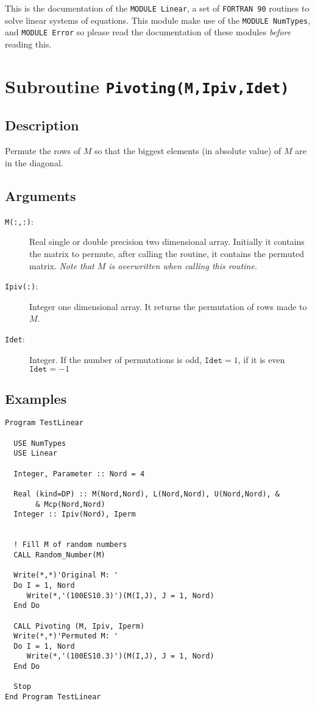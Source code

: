 This is the documentation of the \texttt{MODULE Linear}, a set
of \texttt{FORTRAN 90} routines to solve linear systems of
equations. This module make use of the \texttt{MODULE NumTypes},
and \texttt{MODULE Error} so please read the
documentation of these modules \emph{before} reading this.


\section{Subroutine \texttt{Pivoting(M,Ipiv,Idet)}}

\subsection{Description}

Permute the rows of $M$ so that the biggest elements (in absolute
value) of $M$ are in the diagonal.

\subsection{Arguments}

\begin{description}
\item[\texttt{M(:,:)}: ] Real single or double precision two dimensional
  array. Initially it contains the matrix to permute, after calling
  the routine, it contains the permuted matrix. \emph{Note that $M$ is
    overwritten when calling this routine}. 
\item[\texttt{Ipiv(:)}: ] Integer one dimensional array. It returns
  the permutation of rows made to $M$.
\item[\texttt{Idet}: ] Integer. If the number of permutations is odd,
  $\mathtt{Idet}=1$, if it is even $\mathtt{Idet}=-1$
\end{description}

\subsection{Examples}

\begin{verbatim}
Program TestLinear

  USE NumTypes
  USE Linear

  Integer, Parameter :: Nord = 4

  Real (kind=DP) :: M(Nord,Nord), L(Nord,Nord), U(Nord,Nord), &
       & Mcp(Nord,Nord)
  Integer :: Ipiv(Nord), Iperm


  ! Fill M of random numbers
  CALL Random_Number(M)

  Write(*,*)'Original M: '
  Do I = 1, Nord
     Write(*,'(100ES10.3)')(M(I,J), J = 1, Nord)
  End Do

  CALL Pivoting (M, Ipiv, Iperm)
  Write(*,*)'Permuted M: '
  Do I = 1, Nord
     Write(*,'(100ES10.3)')(M(I,J), J = 1, Nord)
  End Do

  Stop
End Program TestLinear
\end{verbatim}


